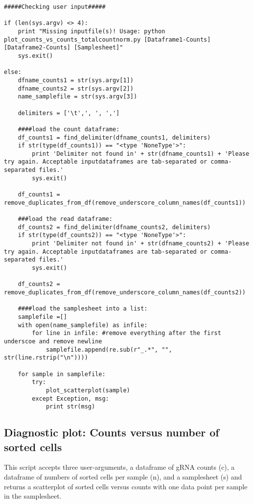 \begin{footnotesize}
\begin{lstlisting}
#####Checking user input#####

if (len(sys.argv) <> 4):
    print "Missing inputfile(s)! Usage: python plot_counts_vs_counts_totalcountnorm.py [Dataframe1-Counts] [Dataframe2-Counts] [Samplesheet]"
    sys.exit()

else:
    dfname_counts1 = str(sys.argv[1])
    dfname_counts2 = str(sys.argv[2])
    name_samplefile = str(sys.argv[3])

    delimiters = ['\t',', ', ',']

    ####load the count dataframe:
    df_counts1 = find_delimiter(dfname_counts1, delimiters)
    if str(type(df_counts1)) == "<type 'NoneType'>":
        print 'Delimiter not found in' + str(dfname_counts1) + 'Please try again. Acceptable inputdataframes are tab-separated or comma-separated files.'
        sys.exit()

    df_counts1 = remove_duplicates_from_df(remove_underscore_column_names(df_counts1))

    ###load the read dataframe:
    df_counts2 = find_delimiter(dfname_counts2, delimiters)
    if str(type(df_counts2)) == "<type 'NoneType'>":
        print 'Delimiter not found in' + str(dfname_counts2) + 'Please try again. Acceptable inputdataframes are tab-separated or comma-separated files.'
        sys.exit()

    df_counts2 = remove_duplicates_from_df(remove_underscore_column_names(df_counts2))

    ####load the samplesheet into a list:
    samplefile =[]
    with open(name_samplefile) as infile:
        for line in infile: #remove everything after the first underscoe and remove newline
            samplefile.append(re.sub(r"_.*", "", str(line.rstrip("\n"))))

    for sample in samplefile:
        try:
            plot_scatterplot(sample)
        except Exception, msg:
            print str(msg)

\end{lstlisting}

\subsection{Diagnostic plot: Counts versus number of sorted cells}

This script accepts three user-arguments, a dataframe of gRNA counts (c), a dataframe of numbers of sorted cells per sample (n), and a samplesheet (s) and returns a scatterplot of sorted cells versus counts with one data point per sample in the samplesheet.


\end{footnotesize}
